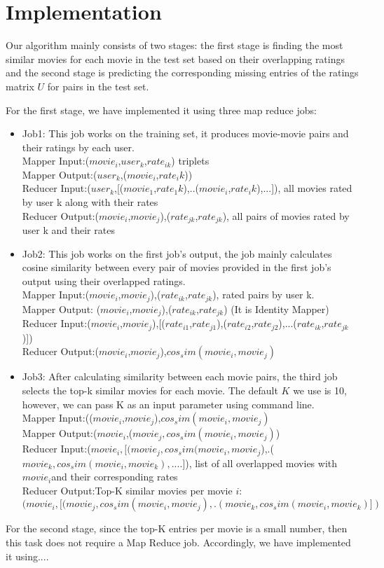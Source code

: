 \section{Implementation}
Our algorithm mainly consists of two stages: the first stage is finding the most similar movies for each movie in the test set based on their overlapping ratings and the second stage is predicting the corresponding missing entries of the ratings matrix $U$ for pairs in the test set.

For the first stage, we have implemented it using three map reduce jobs:\\
\begin{itemize}
\item  Job1:
This job works on the training set, it produces movie-movie pairs and their ratings by each user.\\
Mapper Input:($movie_i$,$user_k$,$rate_{ik}$) triplets\\
Mapper Output:($user_k$,($movie_i$,$rate_ik$))\\
Reducer Input:($user_k$,[($movie_1$,$rate_1k$),..($movie_i$,$rate_ik$),...]), all movies rated by user k along with their rates\\
Reducer Output:($movie_i$,$movie_j$),($rate_{jk}$,$rate_{jk}$), all pairs of movies rated by user k and their rates \\
\item Job2:
This job works on the first job's output, the job mainly calculates cosine similarity between every pair of movies provided in the first job's output using their overlapped ratings.\\ 
Mapper Input:($movie_i$,$movie_j$),($rate_{ik}$,$rate_{jk}$), rated pairs by user k.\\
Mapper Output: ($movie_i$,$movie_j$),($rate_{ik}$,$rate_{jk}$) (It is Identity Mapper)\\
Reducer Input:($movie_i$,$movie_j$),[($rate_{i1}$,$rate_{j1}$),($rate_{i2}$,$rate_{j2}$),...($rate_{ik}$,$rate_{jk}$)])\\
Reducer Output:($movie_i$,$movie_j$),$cos_sim(movie_i,movie_j)$\\
\item Job3:
After calculating similarity between each movie pairs, the third job selects the top-k similar movies for each movie. The default $K$ we use is 10, however, we can pass K as an input parameter using command line.\\
Mapper Input:(($movie_i$,$movie_j$),$cos_sim(movie_i,movie_j)$\\
Mapper Output:($movie_i$,($movie_j,cos_sim(movie_i,movie_j)$)\\
Reducer Input:($movie_i,[(movie_j,cos_sim(movie_i,movie_j$),.($movie_k,cos_sim(movie_i,movie_k),....]$), list of all overlapped movies with $movie_i$and their corresponding rates\\
Reducer Output:Top-K similar movies per movie $i$: $(movie_i,[(movie_j,cos_sim(movie_i,movie_j),.(movie_k,cos_sim(movie_i,movie_k)])$\\
\end{itemize}

For the second stage, since the top-K entries per movie is a small number, then this task does not require a Map Reduce job. Accordingly, we have implemented it using....
